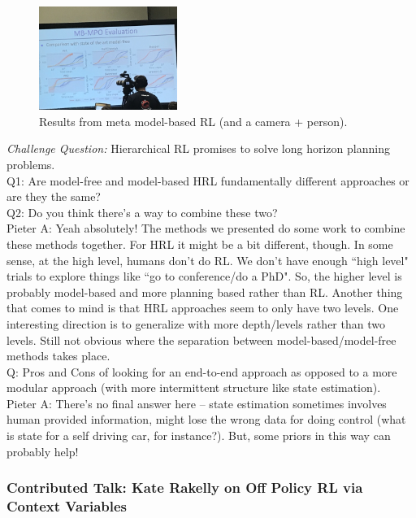 \begin{figure}[h!]
    \centering
    \includegraphics[width=0.4\textwidth]{images/mbrl_results.JPG}
    \caption{Results from meta model-based RL (and a camera + person).}
    \label{fig:meta_mbrl}
\end{figure}


{\it Challenge Question:} Hierarchical RL promises to solve long horizon planning problems. \\

Q1: Are model-free and model-based HRL fundamentally different approaches or are they the same? \\

Q2: Do you think there's a way to combine these two? \\

Pieter A: Yeah absolutely! The methods we presented do some work to combine these methods together. For HRL it might be a bit different, though. In some sense, at the high level, humans don't do RL. We don't have enough ``high level" trials to explore things like ``go to conference/do a PhD". So, the higher level is probably model-based and more planning based rather than RL. Another thing that comes to mind is that HRL approaches seem to only have two levels. One interesting direction is to generalize with more depth/levels rather than two levels. Still not obvious where the separation between model-based/model-free methods takes place. \\

Q: Pros and Cons of looking for an end-to-end approach as opposed to a more modular approach (with more intermittent structure like state estimation). \\

Pieter A: There's no final answer here -- state estimation sometimes involves human provided information, might lose the wrong data for doing control (what is state for a self driving car, for instance?). But, some priors in this way can probably help!


\subsubsection{Contributed Talk: Kate Rakelly on Off Policy RL via Context Variables}

